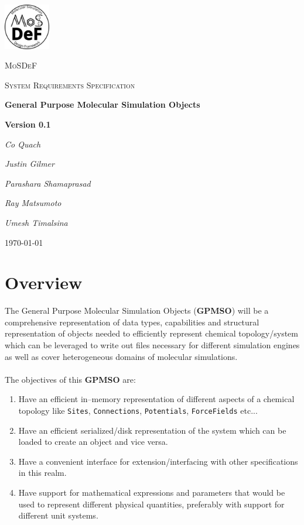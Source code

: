 \documentclass[12pt]{article}
\begin{document}
\begin{titlepage}
	\centering
	\includegraphics[width=0.15\textwidth]{docs/logo}\par\vspace{1cm}
	{\scshape\LARGE MoSDeF \par}
	\vspace{1cm}
	{\scshape\Large System Requirements Specification\par}
	\vspace{1.5cm}
	{\huge\bfseries General Purpose Molecular Simulation Objects\par}
	\vspace{1cm}
	{\huge\bfseries Version 0.1\par}
	\vspace{2cm}
	{\Large\itshape Co Quach\par}
	{\Large\itshape Justin Gilmer\par}
	{\Large\itshape Parashara Shamaprasad\par}
	{\Large\itshape Ray Matsumoto\par}
	{\Large\itshape Umesh Timalsina\par}

	\vfill

	{\large \today\par}
\end{titlepage}

{\centering \section*{Overview}}
\noindent The General Purpose Molecular Simulation Objects (\textbf{GPMSO}) will be a comprehensive representation of data types, capabilities and structural representation of objects needed to efficiently represent chemical topology/system which can be leveraged to write out files necessary for different simulation engines as well as cover heterogeneous domains of molecular simulations. \\~\\
The objectives of this \textbf{GPMSO} are:
\begin{enumerate}
    \item Have an efficient in--memory representation of different aspects of a chemical topology like \texttt{Sites}, \texttt{Connections}, \texttt{Potentials}, \texttt{ForceFields} etc...
    \item Have an efficient serialized/disk representation of the system which can be loaded to create an object and vice versa.
    \item Have a convenient interface for extension/interfacing with other specifications in this realm.
    \item Have support for mathematical expressions and parameters that would be used to represent different physical quantities, preferably with support for different unit systems.
\end{enumerate}
\end{document}

